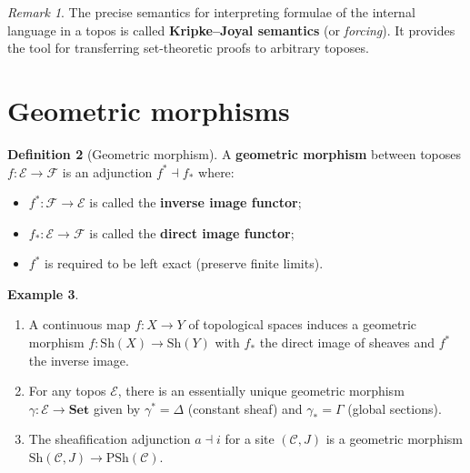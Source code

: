 \documentclass[a4paper,12pt]{book}
\newcommand{\Set}{\mathbf{Set}}
\theoremstyle{definition}
\newtheorem{definition}{Definition}[section]
\newtheorem{example}[definition]{Example}
\theoremstyle{plain}
\theoremstyle{remark}
\newtheorem{remark}[definition]{Remark}
\begin{document}
\begin{remark}\label{rem:kripke-joyal}
The precise semantics for interpreting formulae of the internal language
in a topos is called \textbf{Kripke--Joyal semantics} (or \emph{forcing}).
It provides the tool for transferring set-theoretic proofs to arbitrary
toposes.
\end{remark}



\section{Geometric morphisms}\label{sec:geometric-morphisms}


\begin{definition}[Geometric morphism]\label{def:geometric-morphism}
A \textbf{geometric morphism} between toposes
$f\colon\mathcal{E}\to\mathcal{F}$ is an adjunction $f^*\dashv f_*$
where:
\begin{itemize}
\item $f^*\colon\mathcal{F}\to\mathcal{E}$ is called the \textbf{inverse
      image functor};
\item $f_*\colon\mathcal{E}\to\mathcal{F}$ is called the \textbf{direct
      image functor};
\item $f^*$ is required to be left exact (preserve finite limits).
\end{itemize}
\end{definition}

\begin{example}\label{ex:geometric-morphisms}
\begin{enumerate}[label=(\roman*)]
\item A continuous map $f\colon X\to Y$ of topological spaces induces
      a geometric morphism $f\colon\mathrm{Sh}(X)\to\mathrm{Sh}(Y)$
      with $f_*$ the direct image of sheaves and $f^*$ the inverse
      image.
\item For any topos $\mathcal{E}$, there is an essentially unique
      geometric morphism $\gamma\colon\mathcal{E}\to\Set$ given by
      $\gamma^* = \Delta$ (constant sheaf) and $\gamma_* = \Gamma$
      (global sections).
\item The sheafification adjunction $a\dashv i$ for a site $(\mathcal{C},J)$
      is a geometric morphism
      $\mathrm{Sh}(\mathcal{C},J)\to\mathrm{PSh}(\mathcal{C})$.
\end{enumerate}
\end{example}
\end{document}
